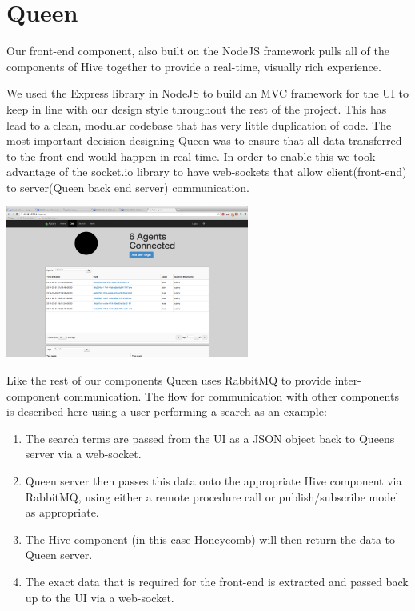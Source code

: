 \section{Queen}

Our front-end component, also built on the NodeJS framework pulls all of the
components of Hive together to provide a real-time, visually rich experience.

We used the Express\cite{express} library in NodeJS to build an MVC framework for the UI
to
keep in line with our design style throughout the rest of the project. This has
lead to a clean, modular codebase that has very little duplication of code.
The most important decision designing Queen was to ensure that all data
transferred to the front-end would happen in real-time. In order to enable this
we took advantage of the socket.io\cite{socket} library to have web-sockets that allow
client(front-end) to server(Queen back end server) communication.

\vspace{10 mm}
\graphicspath{{./pics/}}
\includegraphics[width=8cm, keepaspectratio]{data.png}
\vspace{10 mm}

Like the rest of our components Queen uses RabbitMQ to provide inter-component
communication. The flow for communication with other components is described
here
using a user performing a search as an example:

\begin{enumerate}
  \item The search terms are passed from the UI as a JSON object back to
  Queens
  server via a web-socket.
  \item Queen server then passes this data onto the appropriate Hive
  component
  via RabbitMQ, using either a remote procedure call or
  publish/subscribe model
  as appropriate.
  \item The Hive component (in this case Honeycomb) will then
  return the data to
  Queen server.
  \item The exact data that is required for the
  front-end is extracted and
  passed back up to the UI via a web-socket.
\end{enumerate}

